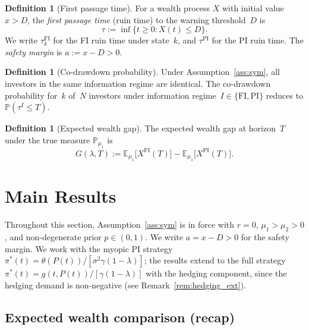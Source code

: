\documentclass[12pt]{article}
\theoremstyle{remark}
\theoremstyle{definition}
\newtheorem{definition}[theorem]{Definition}
\newcommand{\E}{\mathbb{E}}
\newcommand{\Prob}{\mathbb{P}}
\newcommand{\FI}{\mathrm{FI}}
\newcommand{\PI}{\mathrm{PI}}
\begin{document}
\begin{definition}[First passage time]\label{def:fpt}
For a wealth process $X$ with initial value $x > D$, the
\emph{first passage time} (ruin time) to the warning threshold~$D$ is
\begin{equation}\label{eq:fpt}
  \tau := \inf\{t \ge 0 : X(t) \le D\}.
\end{equation}
We write $\tau_k^{\FI}$ for the FI ruin time under state~$k$, and
$\tau^{\PI}$ for the PI ruin time.
The \emph{safety margin} is $a := x - D > 0$.
\end{definition}

\begin{definition}[Co-drawdown probability]\label{def:codrawdown}
Under Assumption~\ref{ass:sym}, all investors in the same information
regime are identical.
The co-drawdown probability for~$k$ of~$N$ investors under information
regime~$I \in \{\FI, \PI\}$ reduces to
$\Prob(\tau^I \le T)$.
\end{definition}

\begin{definition}[Expected wealth gap]\label{def:gap}
The expected wealth gap at horizon~$T$ under the true measure
$\Prob_{\mu_1}$ is
\begin{equation}\label{eq:gap_def}
  G(\lambda, T) := \E_{\mu_1}\bigl[X^{\FI}(T)\bigr]
                 - \E_{\mu_1}\bigl[X^{\PI}(T)\bigr].
\end{equation}
\end{definition}

\section{Main Results}\label{sec:results}

Throughout this section, Assumption~\ref{ass:sym} is in force with
$r = 0$, $\mu_1 > \mu_2 > 0$, and non-degenerate prior $p \in (0,1)$.
We write $a = x - D > 0$ for the safety margin.
We work with the myopic PI strategy
$\pi^*(t) = \theta(P(t))/[\sigma^2\gamma(1-\lambda)]$;
the results extend to the full strategy
$\pi^*(t) = g(t,P(t))/[\gamma(1-\lambda)]$ with the hedging
component, since the hedging demand is non-negative
(see Remark~\ref{rem:hedging_ext}).

\subsection{Expected wealth comparison (recap)}
\label{sec:wealth_comp}
\end{document}
